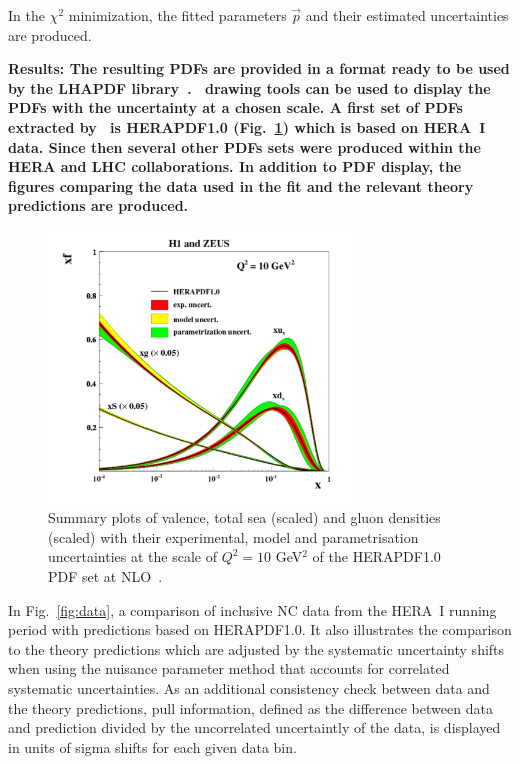 \begin{description}
%
In the $\chi^2$ minimization,
the fitted parameters $\vec{p}$ and their estimated uncertainties are produced. 
%
\item
\bf{Results:} \rm 
The resulting PDFs are provided in a format ready to be used by the LHAPDF 
library~\cite{lhapdf,lhapdfweb}.
\fitter\ drawing tools can be used to display the PDFs with the uncertainty at a chosen scale.  
A first set of PDFs extracted by \fitter~is HERAPDF1.0 \cite{h1zeus:2009wt} (Fig.~\ref{fig:hera1}) 
which is based on HERA~I data.
Since then several other PDFs sets were produced within the HERA and LHC collaborations.
In addition to PDF display, 
the figures comparing the data used in the fit and the relevant theory predictions are produced. 
\begin{figure}[!ht]
   \centering
   \includegraphics[width=8cm]{hera1.pdf}
   \caption{Summary plots of valence, total sea (scaled) and gluon densities (scaled) with their experimental, model and parametrisation uncertainties at the scale of $Q^2=10$ GeV$^2$ of the HERAPDF1.0 PDF set at NLO~\cite{h1zeus:2009wt}.}
 \label{fig:hera1}
\end{figure}
In Fig.~\ref{fig:data}, a comparison of inclusive NC data from the HERA~I running period with predictions based on HERAPDF1.0. It also illustrates the comparison to the theory predictions which are adjusted by the  
systematic uncertainty shifts when using the nuisance parameter method that accounts for 
correlated systematic uncertainties. 
As an additional consistency check between data and the theory predictions, pull information, defined as the difference between data and prediction divided by the uncorrelated uncertaintly of the data, is displayed in units of sigma shifts for each given data bin.


\end{description}

